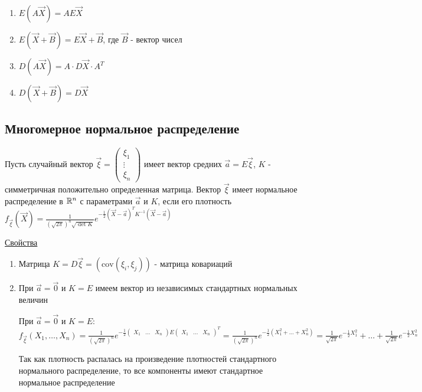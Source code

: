 \documentclass[12pt]{article}
\begin{document}
\begin{enumerate}
    \item $E (A \vec X) = A E \vec X$

    \item $E (\vec X + \vec B) = E \vec X + \vec B$, где $\vec B$ - вектор чисел

    \item $D (A \vec X) = A \cdot D \vec X \cdot A^T$

    \item $D (\vec X + \vec B) = D \vec X$
\end{enumerate}

\subsection{Многомерное нормальное распределение}

\Def Пусть случайный вектор $\vec \xi = \begin{pmatrix}\xi_1 \\ \vdots \\ \xi_n\end{pmatrix}$ имеет вектор средних 
$\vec a = E \vec \xi$, $K$ - симметричная положительно определенная матрица. Вектор $\vec \xi$ 
имеет нормальное распределение в $\mathbb{R}^n$ с параметрами $\vec a$ и $K$, если его плотность 
$f_{\vec \xi} (\vec X) = \frac{1}{\left(\sqrt{2\pi}\right)^n \sqrt{\det K}} e^{-\frac{1}{2} (\vec X - \vec a)^T K^{-1} (\vec X - \vec a)}$


\underline{Свойства}

\begin{enumerate}
    \item Матрица $K = D \vec \xi = \left(\mathrm{cov} (\xi_i, \xi_j)\right)$ - матрица ковариаций

    \item При $\vec a = \vec 0$ и $K = E$ имеем вектор из независимых стандартных нормальных величин

    \begin{MyProof}
        При $\vec a = \vec 0$ и $K = E$: $f_{\vec \xi} (X_1, \dots, X_n) = \frac{1}{\left(\sqrt{2\pi}\right)^n} 
        e^{-\frac{1}{2} \begin{pmatrix}X_1 & \dots & X_n\end{pmatrix} E \begin{pmatrix}X_1 & \dots & X_n\end{pmatrix}^T} = 
        \frac{1}{\left(\sqrt{2\pi}\right)^n} e^{-\frac{1}{2} (X_1^2 + \dots + X_n^2)} = 
        \frac{1}{\sqrt{2\pi}} e^{-\frac{1}{2} X_1^2} + \dots + \frac{1}{\sqrt{2\pi}} e^{-\frac{1}{2} X_n^2}$

        Так как плотность распалась на произведение плотностей стандартного нормального распределение, то все компоненты имеют стандартное нормальное распределение
    \end{MyProof}
\end{enumerate}
\end{document}
